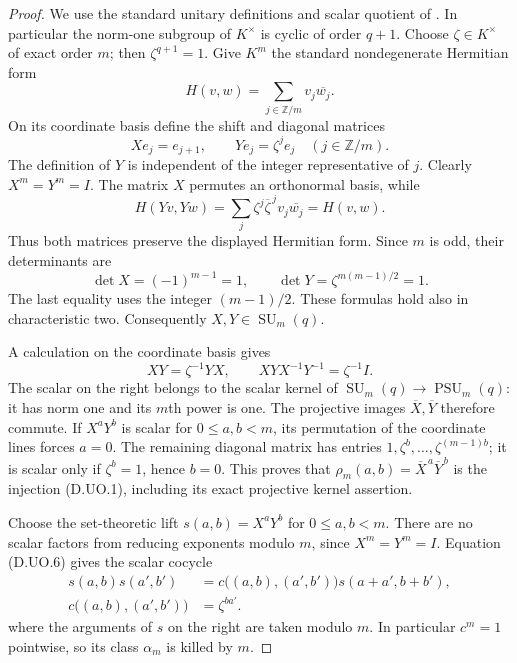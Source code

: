 \begin{proof}
We use the standard unitary definitions and scalar
quotient of \citet[pp.~114--116, including Lemma~10.1
and its complete proof]{Taylor1992ClassicalB}.
In particular the norm-one subgroup of $K^\times$
is cyclic of order $q+1$. Choose $\zeta\in K^\times$
of exact order $m$; then $\zeta^{q+1}=1$.
Give $K^m$ the standard nondegenerate Hermitian form
\[
             H(v,w)=\sum_{j\in\mathbb Z/m}v_j\overline{w_j}.
                                                               \tag{D.UO.3}
\]
On its coordinate basis define the shift and diagonal
matrices
\[
 Xe_j=e_{j+1},\qquad Ye_j=\zeta^j e_j
                         \quad(j\in\mathbb Z/m).       \tag{D.UO.4}
\]
The definition of $Y$ is independent of the integer
representative of $j$. Clearly $X^m=Y^m=I$.
The matrix $X$ permutes an orthonormal basis, while
\[
 H(Yv,Yw)=\sum_j\zeta^j\overline{\zeta}^{\,j}
                              v_j\overline{w_j}
                         =H(v,w).
\]
Thus both matrices preserve the displayed Hermitian
form. Since $m$ is odd, their determinants are
\[
 \det X=(-1)^{m-1}=1,
 \qquad \det Y=\zeta^{m(m-1)/2}=1.                     \tag{D.UO.5}
\]
The last equality uses the integer $(m-1)/2$.
These formulas hold also in characteristic two.
Consequently $X,Y\in\operatorname{SU}_m(q)$.

A calculation on the coordinate basis gives
\[
       XY=\zeta^{-1}YX,
       \qquad XYX^{-1}Y^{-1}=\zeta^{-1}I.              \tag{D.UO.6}
\]
The scalar on the right belongs to the scalar
kernel of $\operatorname{SU}_m(q)\to
\operatorname{PSU}_m(q)$: it has norm one and its
$m$th power is one.
The projective images $\overline X,\overline Y$
therefore commute. If $X^aY^b$ is scalar for
$0\le a,b<m$, its permutation of the coordinate
lines forces $a=0$. The remaining diagonal matrix
has entries $1,\zeta^b,\ldots,\zeta^{(m-1)b}$;
it is scalar only if $\zeta^b=1$, hence $b=0$.
This proves that
$\rho_m(a,b)=\overline X^{\,a}\overline Y^{\,b}$
is the injection (D.UO.1), including its exact
projective kernel assertion.

Choose the set-theoretic lift
$s(a,b)=X^aY^b$ for $0\le a,b<m$.
There are no scalar factors from reducing exponents
modulo $m$, since $X^m=Y^m=I$.
Equation (D.UO.6) gives the scalar cocycle
\[
 \begin{aligned}
 s(a,b)s(a',b')
   &=c\bigl((a,b),(a',b')\bigr)s(a+a',b+b'),\\
 c\bigl((a,b),(a',b')\bigr)&=\zeta^{ba'}.
 \end{aligned}                                              \tag{D.UO.7}
\]
where the arguments of $s$ on the right are taken
modulo $m$. In particular $c^m=1$ pointwise, so
its class $\alpha_m$ is killed by $m$.


\end{proof}
